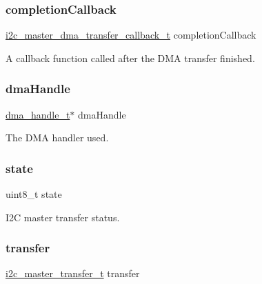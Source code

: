 \subsubsection{\texorpdfstring{completionCallback}{completionCallback}}
{\footnotesize\ttfamily \mbox{\hyperlink{group__i2c__dma__driver_gaa04081e50be4d84531d2653c2db6c0f9}{i2c\+\_\+master\+\_\+dma\+\_\+transfer\+\_\+callback\+\_\+t}} completion\+Callback}

A callback function called after the D\+MA transfer finished. \mbox{\label{struct__i2c__master__dma__handle_a199347e0ec28f8597c9be48b5d0b8fec}} 
\subsubsection{\texorpdfstring{dmaHandle}{dmaHandle}}
{\footnotesize\ttfamily \mbox{\hyperlink{group__dma_gac4a65788d7e5762d16a41a50b2cd7956}{dma\+\_\+handle\+\_\+t}}$\ast$ dma\+Handle}

The D\+MA handler used. \mbox{\label{struct__i2c__master__dma__handle_a0b57aa10271a66f3dc936bba1d2f3830}} 
\subsubsection{\texorpdfstring{state}{state}}
{\footnotesize\ttfamily uint8\+\_\+t state}

I2C master transfer status. \mbox{\label{struct__i2c__master__dma__handle_a9f792796934731101c55954d82000811}} 
\subsubsection{\texorpdfstring{transfer}{transfer}}
{\footnotesize\ttfamily \mbox{\hyperlink{group__i2c__driver_ga0e25c3c153992361c8d359a86b70d3c6}{i2c\+\_\+master\+\_\+transfer\+\_\+t}} transfer}

